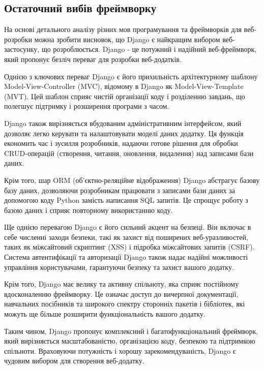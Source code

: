 \subsection{Остаточний вибів фреймворку}
\label{subsec:final-choice-subsection}

На основі детального аналізу різних мов програмування та фреймворків для веб-розробки можна зробити висновок, що Django є найкращим вибором веб-застосунку, що розроблюється. Django - це потужний і надійний веб-фреймворк, який пропонує безліч переваг для розробки веб-додатків.

Однією з ключових переваг Django є його прихильність архітектурному шаблону Model-View-Controller (MVC), відомому в Django як Model-View-Template (MVT). Цей шаблон сприяє чистій організації коду і розділенню завдань, що полегшує підтримку і розширення програми з часом.

Django також вирізняється вбудованим адміністративним інтерфейсом, який дозволяє легко керувати та налаштовувати моделі даних додатку. Ця функція економить час і зусилля розробників, надаючи готове рішення для обробки CRUD-операцій (створення, читання, оновлення, видалення) над записами бази даних.

Крім того, шар ORM (об'єктно-реляційне відображення) Django абстрагує базову базу даних, дозволяючи розробникам працювати з записами бази даних за допомогою коду Python замість написання SQL запитів. Це спрощує роботу з базою даних і сприяє повторному використанню коду.

Ще однією перевагою Django є його сильний акцент на безпеці. Він включає в себе численні заходи безпеки, такі як захист від поширених веб-уразливостей, таких як міжсайтовий скриптинг (XSS) і підробка міжсайтових запитів (CSRF). Система автентифікації та авторизації Django також надає надійні можливості управління користувачами, гарантуючи безпеку та захист вашого додатку.

Крім того, Django має велику та активну спільноту, яка сприяє постійному вдосконаленню фреймворку. Це означає доступ до вичерпної документації, навчальних посібників та широкого спектру сторонніх пакетів і бібліотек, які можуть ще більше розширити функціональність вашого додатку.

Таким чином, Django пропонує комплексний і багатофункціональний фреймворк, який вирізняється масштабованістю, організацією коду, безпекою та підтримкою спільноти. Враховуючи потужність і хорошу зарекомендуваність, Django є чудовим вибором для створення веб-додатку.